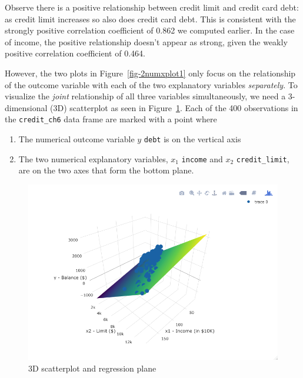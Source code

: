 \documentclass[
  letterpaper,
  DIV=11,
  numbers=noendperiod]{scrreprt}
\providecommand{\tightlist}{%
  \setlength{\itemsep}{0pt}\setlength{\parskip}{0pt}}\usepackage{longtable,booktabs,array}
\theoremstyle{definition}
\theoremstyle{remark}
\begin{document}
Observe there is a positive relationship between credit limit and credit
card debt: as credit limit increases so also does credit card debt. This
is consistent with the strongly positive correlation coefficient of
0.862 we computed earlier. In the case of income, the positive
relationship doesn't appear as strong, given the weakly positive
correlation coefficient of 0.464.

However, the two plots in Figure~\ref{fig-2numxplot1} only focus on the
relationship of the outcome variable with each of the two explanatory
variables \emph{separately}. To visualize the \emph{joint} relationship
of all three variables simultaneously, we need a 3-dimensional (3D)
scatterplot as seen in Figure~\ref{fig-3D-scatterplot}. Each of the 400
observations in the \texttt{credit\_ch6} data frame are marked with a
point where

\begin{enumerate}
\def\labelenumi{\arabic{enumi}.}
\tightlist
\item
  The numerical outcome variable \(y\) \texttt{debt} is on the vertical
  axis
\item
  The two numerical explanatory variables, \(x_1\) \texttt{income} and
  \(x_2\) \texttt{credit\_limit}, are on the two axes that form the
  bottom plane.
\end{enumerate}

\begin{figure}

{\centering \includegraphics{images/credit_card_balance_regression_plane.png}

}

\caption{\label{fig-3D-scatterplot}3D scatterplot and regression plane}

\end{figure}
\end{document}
